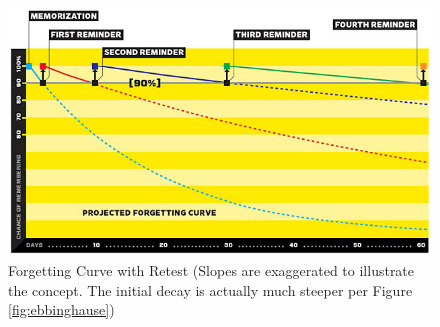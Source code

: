 \documentclass[]{tufte-handout}
\begin{document}
\begin{figure}[h]
  \hspace{1cm}\includegraphics[width=0.8\linewidth]{forgetting-curve-wired-wozniak.jpg}
  \caption{Forgetting Curve with Retest (Slopes are exaggerated to illustrate the concept. The initial decay is actually much steeper per Figure \ref{fig:ebbinghause})}%
\end{figure}
\end{document}
